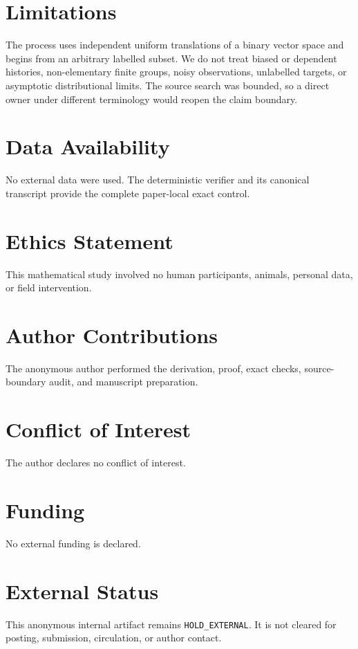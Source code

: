 \documentclass[a4paper,10pt]{amsart}
\begin{document}
\section*{Limitations}
The process uses independent uniform translations of a binary vector space
and begins from an arbitrary labelled subset.  We do not treat biased or
dependent histories, non-elementary finite groups, noisy observations,
unlabelled targets, or asymptotic distributional limits.  The source search
was bounded, so a direct owner under different terminology would reopen the
claim boundary.

\section*{Data Availability}
No external data were used.  The deterministic verifier and its canonical
transcript provide the complete paper-local exact control.

\section*{Ethics Statement}
This mathematical study involved no human participants, animals, personal
data, or field intervention.

\section*{Author Contributions}
The anonymous author performed the derivation, proof, exact checks,
source-boundary audit, and manuscript preparation.

\section*{Conflict of Interest}
The author declares no conflict of interest.

\section*{Funding}
No external funding is declared.

\section*{External Status}
This anonymous internal artifact remains \texttt{HOLD\_EXTERNAL}.  It is not
cleared for posting, submission, circulation, or author contact.



\end{document}
